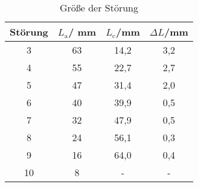 \begin{table}[h!]
  \centering
  \caption{Größe der Störung}
  \label{tab:ascan}
  \begin{tabular}{c c c c}
    \toprule
      Störung & $L_{\text{a}}$/ mm &$L_{\text{c}}$/mm &$\Delta L$/mm\\
    \midrule
3  &   63 & 14,2 &3,2\\
4  &   55 & 22,7 &2,7\\
5  &   47 & 31,4 &2,0\\
6  &   40 & 39,9 &0,5\\
7  &   32 & 47,9 &0,5\\
8  &   24 & 56,1 &0,3\\
9  &   16 & 64,0 &0,4\\
10 &    8 & -    &-\\
    \bottomrule
  \end{tabular}
\end{table}
